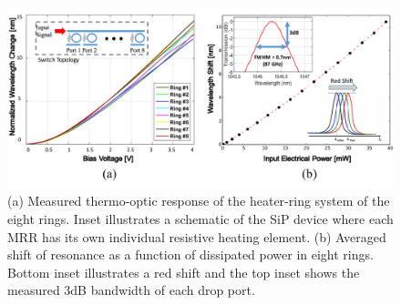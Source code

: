 \begin{figure}[t]
\begin{center}
\includegraphics[width=13cm]{Chapter3/fig2.pdf}
\caption{(a) Measured thermo-optic response of the heater-ring system of the eight rings. Inset illustrates a schematic of the SiP device where each MRR has its own individual resistive heating element. (b) Averaged shift of resonance as a function of dissipated power in eight rings. Bottom inset illustrates a red shift and the top inset shows the measured 3dB bandwidth of each drop port.}
\label{fig2}
\end{center}
\vspace{-0.9cm}
\end{figure}

 
